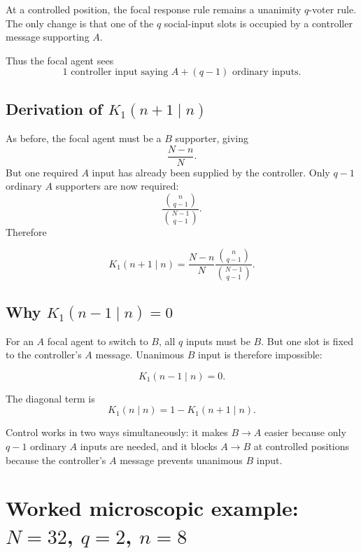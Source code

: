 \documentclass[11pt,a4paper]{article}
\newcommand{\1}{\mathbbm{1}}
\begin{document}
At a controlled position, the focal response rule remains a unanimity $q$-voter rule. The only change is that one of the $q$ social-input slots is occupied by a controller message supporting $A$.

Thus the focal agent sees
\[
\boxed{1\text{ controller input saying }A+(q-1)\text{ ordinary inputs}.}
\]

\subsection{Derivation of $K_1(n+1\mid n)$}

As before, the focal agent must be a $B$ supporter, giving
\[
\frac{N-n}{N}.
\]
But one required $A$ input has already been supplied by the controller. Only $q-1$ ordinary $A$ supporters are now required:
\[
\frac{\binom{n}{q-1}}{\binom{N-1}{q-1}}.
\]
Therefore
\begin{resultbox}
\begin{equation}
\boxed{
K_1(n+1\mid n)
=
\frac{N-n}{N}
\frac{\binom{n}{q-1}}{\binom{N-1}{q-1}}.}
\label{eq:k1plus}
\end{equation}
\end{resultbox}

\subsection{Why $K_1(n-1\mid n)=0$}

For an $A$ focal agent to switch to $B$, all $q$ inputs must be $B$. But one slot is fixed to the controller's $A$ message. Unanimous $B$ input is therefore impossible:
\begin{resultbox}
\begin{equation}
\boxed{K_1(n-1\mid n)=0.}
\label{eq:k1minus}
\end{equation}
\end{resultbox}
The diagonal term is
\begin{equation}
\boxed{K_1(n\mid n)=1-K_1(n+1\mid n).}
\end{equation}

\begin{intuitionbox}
Control works in two ways simultaneously: it makes $B\to A$ easier because only $q-1$ ordinary $A$ inputs are needed, and it blocks $A\to B$ at controlled positions because the controller's $A$ message prevents unanimous $B$ input.
\end{intuitionbox}

\section{Worked microscopic example: $N=32$, $q=2$, $n=8$}
\end{document}
